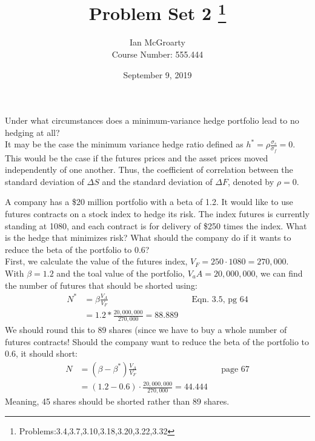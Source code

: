 \documentclass[12pt]{article}
\title{Problem Set 2 \thanks{Problems:3.4,3.7,3.10,3.18,3.20,3.22,3.32}}
\author{Ian McGroarty \\
	Course Number: 555.444}
\date{September 9, 2019}
\newenvironment{problem}[3][Problem]{\begin{trivlist}
\item[\hskip \labelsep {\bfseries #1}\hskip \labelsep {\bfseries #2.}]}{\end{trivlist}}
\begin{document}
\maketitle
\newpage
\begin{problem}{3.4}. Under what circumstances does a minimum-variance hedge portfolio lead to no hedging at all?  \\

It may be the case the minimum variance hedge ratio defined as $h^{*}= \rho \frac{\sigma_s}{\sigma_f} = 0$. This would be the case if the futures prices and the asset prices moved independently of one another. Thus, the coefficient of correlation between the standard deviation of $\Delta S$ and the standard deviation of $\Delta F$, denoted by $\rho = 0. $
  \end{problem}

\begin{problem}{3.7}. A company has a \$20 million portfolio with a beta of 1.2. It would like to use futures contracts
on a stock index to hedge its risk. The index futures is currently standing at 1080, and each
contract is for delivery of \$250 times the index. What is the hedge that minimizes risk? What
should the company do if it wants to reduce the beta of the portfolio to 0.6?  \\

First, we calculate the value of the futures index, $V_F = 250 \cdot 1080 = 270,000$. With $\beta = 1.2$ and the toal value of the portfolio, $V_aA = 20,000,000$, we can find the number of futures that should be shorted using: 
\begin{align*}
 N^{*} & = \beta \frac{V_A}{V_F}  && \text{Eqn. 3.5, pg 64} \\ 
&= 1.2 * \frac{20,000,000}{270,000} = 88.889
\end{align*}
We should round this to 89 shares (since we have to buy a whole number of futures contracts! Should the company want to reduce the beta of the portfolio to 0.6, it should short: 
\begin{align*} 
N &= (\beta - \beta^{*})\frac{V_A}{V_F}  && \text{page 67} \\
&= (1.2-0.6)\cdot \frac{20,000,000}{270,000} = 44.444 
\end{align*}
Meaning, 45 shares should be shorted rather than 89 shares. 
\end{problem} 
\end{document}
